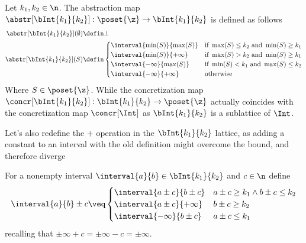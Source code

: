 \begin{definition}\label{def:boundedac}
  Let \(k_1, k_2\in\n\). The abstraction map
  \({\abstr[\bInt{k_1}{k_2}] : \poset{\z} \to \bInt{k_1}{k_2}}\) is
  defined as follows
  \begin{align*}
    \abstr[\bInt{k_1}{k_2}](\emptyset) & \defin \bot \\
    \abstr[\bInt{k_1}{k_2}](S) & \defin \begin{cases}
      \interval{\min(S)}{\max(S)} & \text{if } \max(S) \leq k_2 \text{ and } \min(S) \geq k_1\\
      \interval{\min(S)}{+\infty} & \text{if } \max(S) > k_2 \text{ and } \min(S) \geq k_1 \\
      \interval{-\infty}{\max(S)} & \text{if } \min(S) < k_1 \text{ and } \max(S) \leq k_2 \\
      \interval{-\infty}{+\infty} & \text{otherwise}
    \end{cases}
  \end{align*}
  Where \(S\in\poset{\z}\). While the concretization map
  \({\concr[\bInt{k_1}{k_2}] : \bInt{k_1}{k_2} \to \poset{\z}}\)
  actually coincides with the concretization map \(\concr[\Int]\) as
  \(\bInt{k_1}{k_2}\) is a sublattice of \(\Int\).
\end{definition}

Let's also redefine the \(+\) operation in the \(\bInt{k_1}{k_2}\)
lattice, as adding a constant to an interval with the old definition
might overcome the bound, and therefore diverge

\begin{definition}\label{def:sumbound}
  For a nonempty interval \(\interval{a}{b} \in \bInt{k_1}{k_2}\) and
  \(c \in \n\) define
  \begin{equation*}
    \interval{a}{b} \pm c \veq \begin{cases}
      \interval{a\pm c}{b\pm c} & a \pm c \geq k_1 \land b \pm c \leq k_2 \\
      \interval{a\pm c}{+\infty} & b \pm c \geq k_2 \\
      \interval{-\infty}{b \pm c} & a \pm c \leq k_1
    \end{cases}
  \end{equation*}
  recalling that \(\pm \infty + c = \pm\infty - c = \pm\infty\).
\end{definition}

